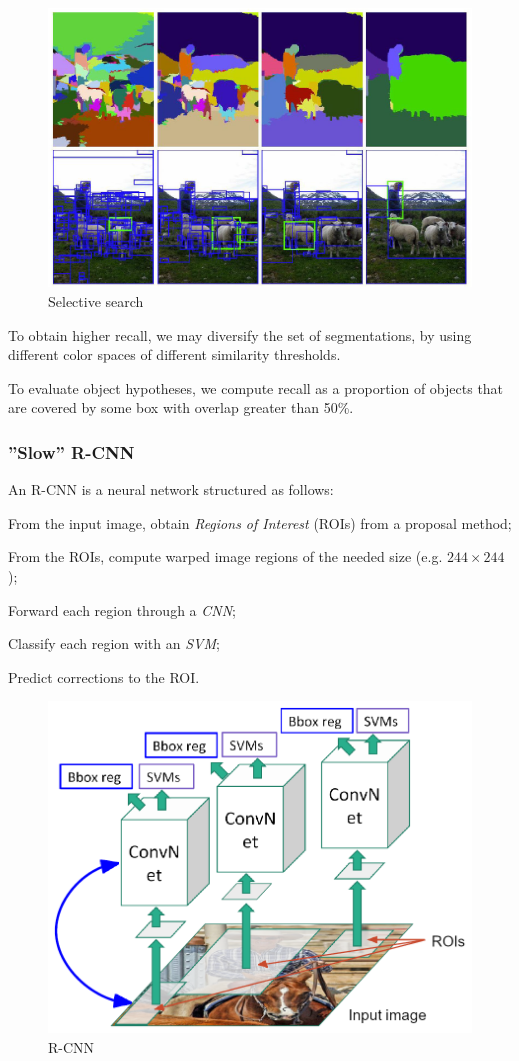 \begin{figure}[h!]
    \centering
    \includegraphics[width=0.6\linewidth]{images/selective-search}
    \caption[Selective search]{Selective search}
    \label{fig:selective-search}
\end{figure}

To obtain higher recall, we may diversify the set of segmentations, by using different color spaces of different similarity thresholds.

To evaluate object hypotheses, we compute recall as a proportion of objects that are covered by some box with overlap greater than 50\%.


\subsubsection{''Slow'' R-CNN}\label{sec:ds-detection-rcnn}

An R-CNN is a neural network structured as follows:
\begin{myenum}
    \item From the input image, obtain \textit{Regions of Interest} (ROIs) from a proposal method;
    \item From the ROIs, compute warped image regions of the needed size (e.g. $244 \times 244$);
    \item Forward each region through a \textit{CNN};
    \item Classify each region with an \textit{SVM};
    \item Predict corrections to the ROI.
\end{myenum}

\begin{figure}[h!]
    \centering
    \includegraphics[width=0.7\linewidth]{images/rcnn}
    \caption[R-CNN]{R-CNN}
    \label{fig:rcnn}
\end{figure}

